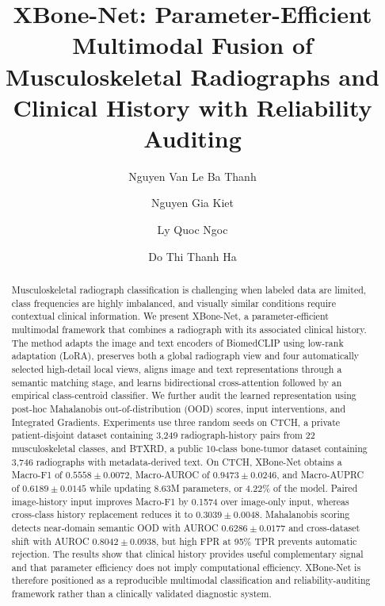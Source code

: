 \documentclass[runningheads]{llncs}
\begin{document}
\title{XBone-Net: Parameter-Efficient Multimodal Fusion of Musculoskeletal Radiographs and Clinical History with Reliability Auditing}

\author{Nguyen Van Le Ba Thanh \and
Nguyen Gia Kiet \and
Ly Quoc Ngoc \and
Do Thi Thanh Ha}


\maketitle

\begin{abstract}
Musculoskeletal radiograph classification is challenging when labeled data are limited, class frequencies are highly imbalanced, and visually similar conditions require contextual clinical information. We present XBone-Net, a parameter-efficient multimodal framework that combines a radiograph with its associated clinical history. The method adapts the image and text encoders of BiomedCLIP using low-rank adaptation (LoRA), preserves both a global radiograph view and four automatically selected high-detail local views, aligns image and text representations through a semantic matching stage, and learns bidirectional cross-attention followed by an empirical class-centroid classifier. We further audit the learned representation using post-hoc Mahalanobis out-of-distribution (OOD) scores, input interventions, and Integrated Gradients. Experiments use three random seeds on CTCH, a private patient-disjoint dataset containing 3,249 radiograph-history pairs from 22 musculoskeletal classes, and BTXRD, a public 10-class bone-tumor dataset containing 3,746 radiographs with metadata-derived text. On CTCH, XBone-Net obtains a Macro-F1 of $0.5558\pm0.0072$, Macro-AUROC of $0.9473\pm0.0246$, and Macro-AUPRC of $0.6189\pm0.0145$ while updating 8.63M parameters, or 4.22\% of the model. Paired image-history input improves Macro-F1 by 0.1574 over image-only input, whereas cross-class history replacement reduces it to $0.3039\pm0.0048$. Mahalanobis scoring detects near-domain semantic OOD with AUROC $0.6286\pm0.0177$ and cross-dataset shift with AUROC $0.8042\pm0.0938$, but high FPR at 95\% TPR prevents automatic rejection. The results show that clinical history provides useful complementary signal and that parameter efficiency does not imply computational efficiency. XBone-Net is therefore positioned as a reproducible multimodal classification and reliability-auditing framework rather than a clinically validated diagnostic system.

\end{abstract}
\end{document}
